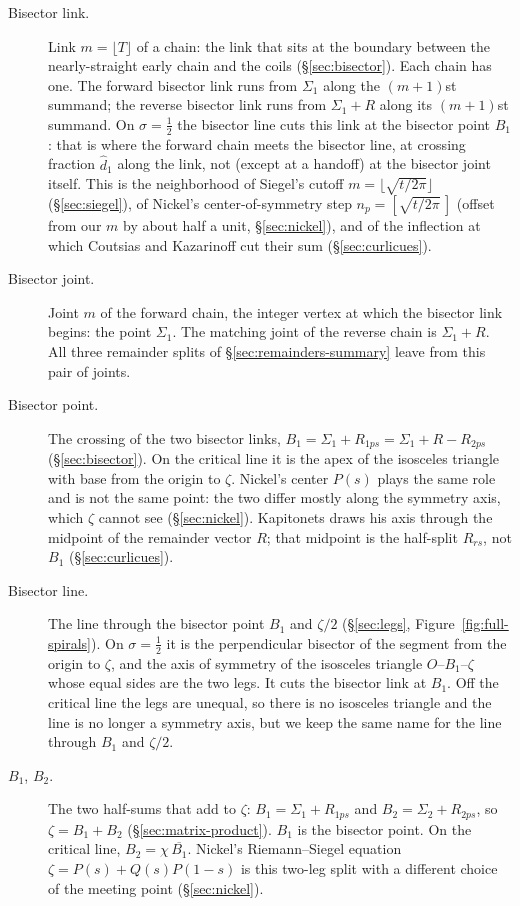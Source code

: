 \documentclass[11pt]{article}
\theoremstyle{definition}
\begin{document}
\begin{description}
\item[Bisector link.]
Link $m=\lfloor T\rfloor$ of a chain: the link that sits at the
boundary between the nearly-straight early chain and the coils
(\S\ref{sec:bisector}).
Each chain has one.
The forward bisector link runs from $\Sigma_1$ along the
$(m+1)$st summand; the reverse bisector link runs from $\Sigma_1+R$
along its $(m+1)$st summand.
On $\sigma=\tfrac12$ the bisector line cuts this link at the
bisector point $B_1$: that is where the forward chain meets the
bisector line, at crossing fraction $\hat d_1$ along the link, not
(except at a handoff) at the bisector joint itself.
This is the neighborhood of Siegel's cutoff
$m=\lfloor\sqrt{t/2\pi}\rfloor$ (\S\ref{sec:siegel}), of Nickel's
center-of-symmetry step $n_p=[\sqrt{t/2\pi}\,]$ (offset from our $m$
by about half a unit, \S\ref{sec:nickel}), and of the inflection at
which Coutsias and Kazarinoff cut their sum
(\S\ref{sec:curlicues}).

\item[Bisector joint.]
Joint $m$ of the forward chain, the integer vertex at which the
bisector link begins: the point $\Sigma_1$.
The matching joint of the reverse chain is $\Sigma_1+R$.
All three remainder splits of \S\ref{sec:remainders-summary} leave
from this pair of joints.

\item[Bisector point.]
The crossing of the two bisector links,
$B_1=\Sigma_1+R_{1ps}=\Sigma_1+R-R_{2ps}$
(\S\ref{sec:bisector}).
On the critical line it is the apex of the isosceles triangle with
base from the origin to $\zeta$.
Nickel's center $P(s)$ plays the same role and is not the same
point: the two differ mostly along the symmetry axis, which $\zeta$
cannot see (\S\ref{sec:nickel}).
Kapitonets draws his axis through the midpoint of the remainder
vector $R$; that midpoint is the half-split $R_{rs}$, not $B_1$
(\S\ref{sec:curlicues}).

\item[Bisector line.]
The line through the bisector point $B_1$ and $\zeta/2$
(\S\ref{sec:legs}, Figure~\ref{fig:full-spirals}).
On $\sigma=\tfrac12$ it is the perpendicular bisector of the
segment from the origin to $\zeta$, and the axis of symmetry of
the isosceles triangle $O$--$B_1$--$\zeta$ whose equal sides are
the two legs. It cuts the bisector link at $B_1$. Off the
critical line the legs are unequal, so there is no isosceles
triangle and the line is no longer a symmetry axis, but we keep
the same name for the line through $B_1$ and $\zeta/2$.

\item[$B_1$, $B_2$.]
The two half-sums that add to $\zeta$:
$B_1=\Sigma_1+R_{1ps}$ and $B_2=\Sigma_2+R_{2ps}$, so
$\zeta=B_1+B_2$ (\S\ref{sec:matrix-product}).
$B_1$ is the bisector point.
On the critical line, $B_2=\chi\,\overline{B_1}$.
Nickel's Riemann--Siegel equation $\zeta=P(s)+Q(s)P(1-s)$ is this
two-leg split with a different choice of the meeting point
(\S\ref{sec:nickel}).
\end{description}
\end{document}
